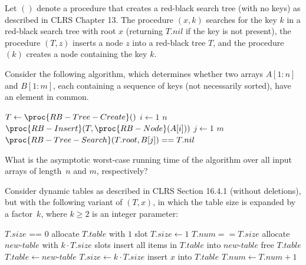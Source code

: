 Let $()$ denote a procedure that creates a red-black search tree (with no keys) as described in CLRS Chapter 13.
The procedure $(x,k)$ searches for the key $k$ in a red-black search tree with root $x$ (returning $T.nil$ if the key is not present), the procedure $(T,z)$ inserts a node $z$ into a red-black tree $T$, and the procedure $(k)$ creates a node containing the key $k$.

Consider the following algorithm, which determines whether two arrays $A[1\!:\!n]$ and $B[1\!:\!m]$, each containing a sequence of keys (not necessarily sorted), have an element in common.

\begin{codebox}
  \li $T \gets \proc{RB-Tree-Create}()$
  \li \For $i \gets 1$ \To $n$ \Do
  \li $\proc{RB-Insert}(T, \proc{RB-Node}(A[i]))$ \End
  \li \For $j \gets 1$ \To $m$ \Do
  \li {} $\proc{RB-Tree-Search}(T.root, B[j]) == T.nil$ \Do
  \li \Return {}\End\End
  \li \Return {}
\end{codebox}
What is the asymptotic worst-case running time of the algorithm over all input arrays of length~$n$ and $m$, respectively?
\oneanswer
\optionsstart
{}
\correct
{}
\optionsend
{}



Consider dynamic tables as described in CLRS Section 16.4.1 (without deletions), but with the following variant of $(T,x)$, in which the table size is expanded by a factor~$k$, where $k\geq 2$ is an integer parameter:

\begin{codebox}
  \li \If $T.size$ == $0$ \Do
  \li allocate $T.table$ with $1$ slot
  \li $T.size \gets 1$ \End
  \li \If $T.num == T.size$ \Do
  \li allocate $\mathit{new\text{-}table}$ with $k \cdot T.size$ slots
  \li insert all items in $T.table$ into $\mathit{new\text{-}table}$
  \li free $T.table$
  \li $T.table \gets \mathit{new\text{-}table}$
  \li $T.size \gets k \cdot T.size$ \End
  \li insert $x$ into $T.table$
  \li $T.num \gets T.num + 1$
\end{codebox}

